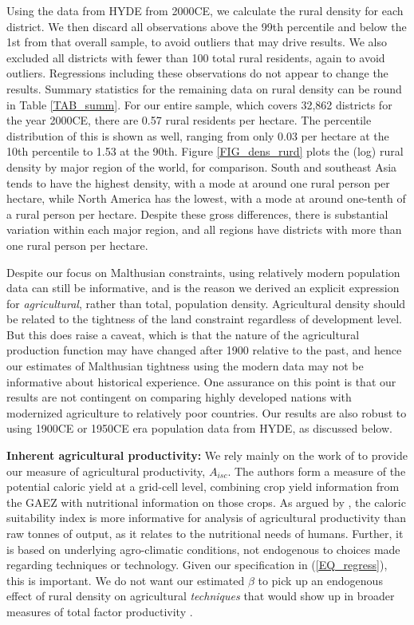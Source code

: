 \documentclass[11pt]{article}
\begin{document}
Using the data from HYDE from 2000CE, we calculate the rural density for each district. We then discard all observations above the 99th percentile and below the 1st from that overall sample, to avoid outliers that may drive results. We also excluded all districts with fewer than 100 total rural residents, again to avoid outliers. Regressions including these observations do not appear to change the results. Summary statistics for the remaining data on rural density can be round in Table \ref{TAB_summ}. For our entire sample, which covers 32,862 districts for the year 2000CE, there are 0.57 rural residents per hectare. The percentile distribution of this is shown as well, ranging from only 0.03 per hectare at the 10th percentile to 1.53 at the 90th. Figure \ref{FIG_dens_rurd} plots the (log) rural density by major region of the world, for comparison. South and southeast Asia tends to have the highest density, with a mode at around one rural person per hectare, while North America has the lowest, with a mode at around one-tenth of a rural person per hectare. Despite these gross differences, there is substantial variation within each major region, and all regions have districts with more than one rural person per hectare. 

Despite our focus on Malthusian constraints, using relatively modern population data can still be informative, and is the reason we derived an explicit expression for \textit{agricultural}, rather than total, population density. Agricultural density should be related to the tightness of the land constraint regardless of development level. But this does raise a caveat, which is that the nature of the agricultural production function may have changed after 1900 relative to the past, and hence our estimates of Malthusian tightness using the modern data may not be informative about historical experience. One assurance on this point is that our results are not contingent on comparing highly developed nations with modernized agriculture to relatively poor countries. Our results are also robust to using 1900CE or 1950CE era population data from HYDE, as discussed below.

\vspace{.5cm}\noindent\textbf{Inherent agricultural productivity:} We rely mainly on the work of \citet{galorozak2016} to provide our measure of agricultural productivity, $A_{isc}$. The authors form a measure of the potential caloric yield at a grid-cell level, combining crop yield information from the GAEZ with nutritional information on those crops. As argued by \citet{galorozak2016}, the caloric suitability index is more informative for analysis of agricultural productivity than raw tonnes of output, as it relates to the nutritional needs of humans. Further, it is based on underlying agro-climatic conditions, not endogenous to choices made regarding techniques or technology. Given our specification in (\ref{EQ_regress}), this is important. We do not want our estimated $\beta$ to pick up an endogenous effect of rural density on agricultural \textit{techniques} that would show up in broader measures of total factor productivity \citep{Boserup1965}.
\end{document}
